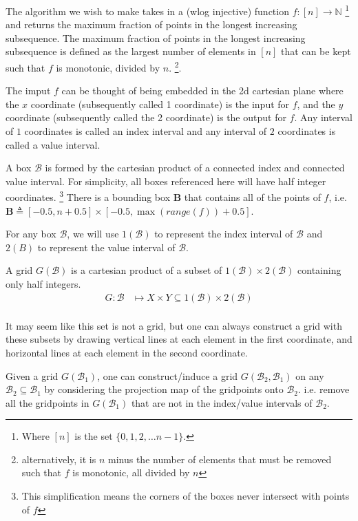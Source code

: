 \documentclass[11pt]{article}
\theoremstyle{definition}
\theoremstyle{remark}
\newcommand{\N}{\mathbb{N}}
\newcommand{\B}{\mathcal{B}}
\begin{document}
The algorithm we wish to make takes in a (wlog injective) function \(f:[n]\to\N\) \footnote{Where \([n]\) is the set \(\{0,1,2,\dots n-1\}\).} and returns the maximum fraction of points in the longest increasing subsequence. The maximum fraction of points in the longest increasing subsequence is defined as the largest number of elements in \([n]\) that can be kept such that \(f\) is monotonic, divided by \(n\). \footnote{alternatively, it is \(n\) minus the number of elements that must be removed such that \(f\) is monotonic, all divided by \(n\)}.

The imput \(f\) can be thought of being embedded in the 2d cartesian plane where the \(x\) coordinate (subsequently called 1 coordinate) is the input for \(f\), and the \(y\) coordinate (subsequently called the 2 coordinate) is the output for \(f\). Any interval of \(1\) coordinates is called an index interval and any interval of \(2\) coordinates is called a value interval.

A box \(\B\) is formed by the cartesian product of a connected index and connected value interval. For simplicity, all boxes referenced here will have half integer coordinates. \footnote{This simplification means the corners of the boxes never intersect with points of \(f\)} There is a bounding box \(\bm B\) that contains all of the points of \(f\), i.e. \(\bm B \triangleq[-0.5,n+0.5]\times [-0.5,\max(range(f))+0.5]\).

For any box \(\B\), we will use \(1(\B)\) to represent the index interval of \(\B\) and \(2(B)\) to represent the value interval of \(\B\).

A grid \(G(\B)\) is a cartesian product of a subset of \(1(\B)\times 2(\B)\) containing only half integers.
\begin{equation}
  \begin{split}
    G:\B&\mapsto X\times Y \subseteq 1(\B)\times 2(\B)\\
  \end{split}
\end{equation}

It may seem like this set is not a grid, but one can always construct a grid with these subsets by drawing vertical lines at each element in the first coordinate, and horizontal lines at each element in the second coordinate.

Given a grid \(G(\B_1)\), one can construct/induce a grid \(G(\B_2,\B_1)\) on any \(\B_2\subseteq \B_1\) by considering the projection map of the gridpoints onto \(\B_2\). i.e. remove all the gridpoints in \(G(\B_1)\) that are not in the index/value intervals of \(\B_2\).
\end{document}
